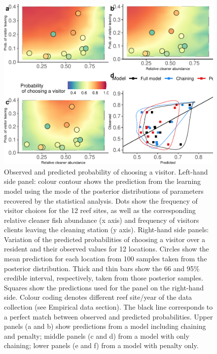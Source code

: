 \documentclass[
  12pt,
]{article}
\begin{document}
\begin{figure}
\includegraphics[width=1\linewidth]{manuscript_BE_files/figure-latex/predFAA-1} \caption{Observed and predicted probability of choosing a visitor. Left-hand side panel: colour contour shows the prediction from the learning model using the mode of the posterior distributions of parameters recovered by the statistical analysis. Dots show the frequency of visitor choices for the 12 reef sites, as well as the corresponding relative cleaner fish abundance (x axis) and frequency of visitors clients leaving the cleaning station (y axis). Right-hand side panels: Variation of the predicted probabilities  of choosing a visitor over a resident and their observed values for 12 locations. Circles show the mean prediction for each location from 100 samples taken from the posterior distribution. Thick and thin bars show the 66 and 95\% credible interval, respectively, taken from those posterior samples. Squares show the predictions used for the panel on the right-hand side. Colour coding denotes different reef site/year of the data collection (see Empirical data section). The black line corresponds to a perfect match between observed and predicted probabilities. Upper panels (a and b) show predictions from a model including chaining and penalty; middle panels (c and d) from a  model with only chaining; lower panels (e and f) from a model with penalty only.}\label{fig:predFAA}
\end{figure}
\end{document}
